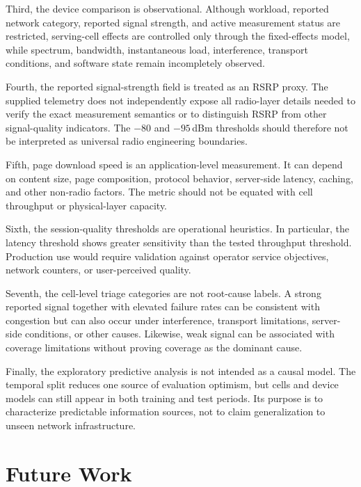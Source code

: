 \documentclass[conference]{IEEEtran}
\begin{document}
Third, the device comparison is observational. Although workload, reported network category, reported signal strength, and active measurement status are restricted, serving-cell effects are controlled only through the fixed-effects model, while spectrum, bandwidth, instantaneous load, interference, transport conditions, and software state remain incompletely observed.

Fourth, the reported signal-strength field is treated as an RSRP proxy. The supplied telemetry does not independently expose all radio-layer details needed to verify the exact measurement semantics or to distinguish RSRP from other signal-quality indicators. The $-80$ and $-95$\,dBm thresholds should therefore not be interpreted as universal radio engineering boundaries.

Fifth, page download speed is an application-level measurement. It can depend on content size, page composition, protocol behavior, server-side latency, caching, and other non-radio factors. The metric should not be equated with cell throughput or physical-layer capacity.

Sixth, the session-quality thresholds are operational heuristics. In particular, the latency threshold shows greater sensitivity than the tested throughput threshold. Production use would require validation against operator service objectives, network counters, or user-perceived quality.

Seventh, the cell-level triage categories are not root-cause labels. A strong reported signal together with elevated failure rates can be consistent with congestion but can also occur under interference, transport limitations, server-side conditions, or other causes. Likewise, weak signal can be associated with coverage limitations without proving coverage as the dominant cause.

Finally, the exploratory predictive analysis is not intended as a causal model. The temporal split reduces one source of evaluation optimism, but cells and device models can still appear in both training and test periods. Its purpose is to characterize predictable information sources, not to claim generalization to unseen network infrastructure.

\section{Future Work}
\end{document}
